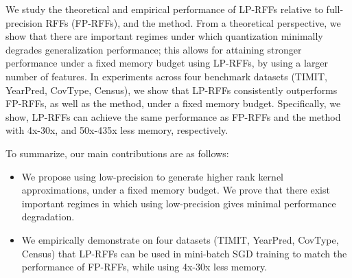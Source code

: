 

We study the theoretical and empirical performance of LP-RFFs relative to full-precision RFFs (FP-RFFs), and the \Nystrom method.  From a theoretical perspective, we show that there are important regimes under which quantization minimally degrades generalization performance; this allows for attaining stronger performance under a fixed memory budget using LP-RFFs, by using a larger number of features. In experiments across four benchmark datasets (TIMIT, YearPred, CovType, Census), we show that LP-RFFs consistently outperforms FP-RFFs, as well as the \Nystrom method, under a fixed memory budget. Specifically, we show, LP-RFFs can achieve the same performance as FP-RFFs and the \Nystrom method with 4x-30x, and 50x-435x less memory, respectively.

To summarize, our main contributions are as follows:
\begin{itemize}
	\item We propose using low-precision to generate higher rank kernel approximations, under a fixed memory budget. We prove that there exist important regimes in which using low-precision gives minimal performance degradation.
	\item We empirically demonstrate on four datasets (TIMIT, YearPred, CovType, Census) that LP-RFFs can be used in mini-batch SGD training to match the performance of FP-RFFs, while using 4x-30x less memory.
\end{itemize}

